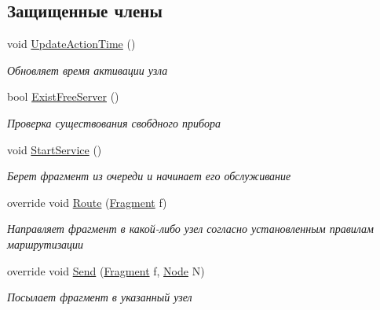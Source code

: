 \subsection*{Защищенные члены}
\begin{DoxyCompactItemize}
\item 
void \hyperlink{class_network_simulator_1_1_service_node_aa832d42c9c93fbfb71f466ff91f45020}{Update\+Action\+Time} ()
\begin{DoxyCompactList}\small\item\em Обновляет время активации узла \end{DoxyCompactList}\item 
bool \hyperlink{class_network_simulator_1_1_service_node_a09388e32fbfd8d848a3348f47cc27e06}{Exist\+Free\+Server} ()
\begin{DoxyCompactList}\small\item\em Проверка существования свобдного прибора \end{DoxyCompactList}\item 
void \hyperlink{class_network_simulator_1_1_service_node_a16e3b098c0c8b3e08288c49078d5b1a5}{Start\+Service} ()
\begin{DoxyCompactList}\small\item\em Берет фрагмент из очереди и начинает его обслуживание \end{DoxyCompactList}\item 
override void \hyperlink{class_network_simulator_1_1_service_node_aa9b820192e97c17822ab0a4c909aeac1}{Route} (\hyperlink{class_network_simulator_1_1_fragment}{Fragment} f)
\begin{DoxyCompactList}\small\item\em Направляет фрагмент в какой-\/либо узел согласно установленным правилам маршрутизации \end{DoxyCompactList}\item 
override void \hyperlink{class_network_simulator_1_1_service_node_a467615866be1603e405dfa24775dca95}{Send} (\hyperlink{class_network_simulator_1_1_fragment}{Fragment} f, \hyperlink{class_network_simulator_1_1_node}{Node} N)
\begin{DoxyCompactList}\small\item\em Посылает фрагмент в указанный узел \end{DoxyCompactList}\end{DoxyCompactItemize}
